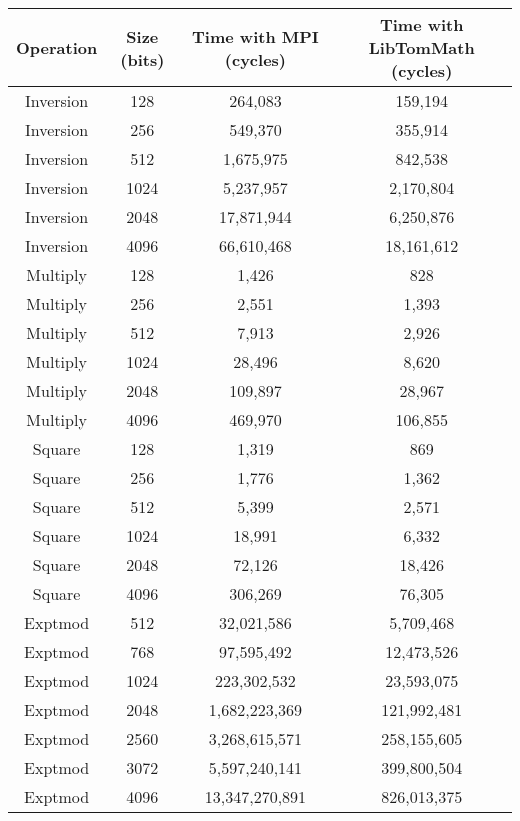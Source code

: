 \documentclass{article}
\begin{document}
\begin{small}
\begin{center}
\begin{tabular}{c|c|c|c}
\hline \textbf{Operation} & \textbf{Size (bits)} & \textbf{Time with MPI (cycles)} & \textbf{Time with LibTomMath (cycles)} \\
\hline
Inversion & 128 & 264,083  & 159,194  \\
Inversion & 256 & 549,370  & 355,914  \\
Inversion & 512 & 1,675,975  & 842,538  \\
Inversion & 1024 & 5,237,957  & 2,170,804  \\
Inversion & 2048 & 17,871,944  & 6,250,876  \\
Inversion & 4096 & 66,610,468  & 18,161,612  \\
\hline
Multiply & 128 & 1,426   & 828    \\
Multiply & 256 & 2,551   & 1,393    \\
Multiply & 512 & 7,913   & 2,926    \\
Multiply & 1024 & 28,496   & 8,620  \\
Multiply & 2048 & 109,897   & 28,967    \\
Multiply & 4096 & 469,970   & 106,855    \\
\hline 
Square & 128 & 1,319   & 869    \\
Square & 256 & 1,776   & 1,362    \\
Square & 512 & 5,399  & 2,571   \\
Square & 1024 & 18,991  & 6,332    \\
Square & 2048 & 72,126  & 18,426   \\
Square & 4096 & 306,269  & 76,305  \\
\hline 
Exptmod & 512 & 32,021,586  & 5,709,468 \\
Exptmod & 768 & 97,595,492  & 12,473,526   \\
Exptmod & 1024 & 223,302,532  & 23,593,075    \\
Exptmod & 2048 & 1,682,223,369   & 121,992,481    \\
Exptmod & 2560 & 3,268,615,571   & 258,155,605    \\
Exptmod & 3072 & 5,597,240,141   & 399,800,504   \\
Exptmod & 4096 & 13,347,270,891   & 826,013,375   

\end{tabular}
\end{center}
\end{small}
\end{document}
